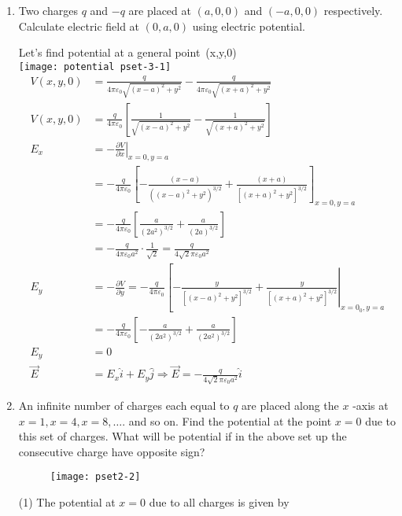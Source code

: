 \begin{enumerate}[label=\color{ocre}\textbf{\arabic*.}]
	\item  Two charges $q$ and $-q$ are placed at $(a, 0,0)$ and $(-a, 0,0)$ respectively. Calculate electric field at $(0, a, 0)$ using electric potential.
	\begin{answer}
		Let's  find potential at a general point\ (x,y,0)\\
		
		\centering
		\texttt{[image: potential pset-3-1]}
		\begin{align*}
		V(x, y, 0) &=\frac{q}{4 \pi \varepsilon_{0} \sqrt{(x-a)^{2}+y^{2}}}-\frac{q}{4 \pi \varepsilon_{0} \sqrt{(x+a)^{2}+y^{2}}} \\
		V(x, y, 0) &=\frac{q}{4 \pi \varepsilon_{0}}\left[\frac{1}{\sqrt{(x-a)^{2}+y^{2}}}-\frac{1}{\sqrt{(x+a)^{2}+y^{2}}}\right] \\
		E_{x} &=-\left.\frac{\partial V}{\partial x}\right|_{x=0, y=a}
		\\&=-\frac{q}{4 \pi \varepsilon_{0}}\left[-\frac{(x-a)}{\left((x-a)^{2}+y^{2}\right)^{3 / 2}}+\frac{(x+a)}{\left[(x+a)^{2}+y^{2}\right]^{3 / 2}}\right]_{x=0, y=a}\\
		&=-\frac{q}{4 \pi \varepsilon_{0}}\left[\frac{a}{\left(2 a^{2}\right)^{3 / 2}}+\frac{a}{(2 a)^{3 / 2}}\right] \\
		&=-\frac{q}{4 \pi \varepsilon_{0} a^{2}} \cdot \frac{1}{\sqrt{2}}=\frac{q}{4 \sqrt{2} \pi \varepsilon_{0} a^{2}}\\
		E_{y} &=-\frac{\partial V}{\partial y}=-\frac{q}{4 \pi \varepsilon_{0}}\left[-\frac{y}{\left[(x-a)^{2}+y^{2}\right]^{3 / 2}}+\left.\frac{y}{\left[(x+a)^{2}+y^{2}\right]^{3 / 2}}\right|_{x=0_{0}, y=a}\right.\\
		&=-\frac{q}{4 \pi \varepsilon_{0}}\left[-\frac{a}{\left(2 a^{2}\right)^{3 / 2}}+\frac{a}{\left(2 a^{2}\right)^{3 / 2}}\right]\\
		E_{y}&=0 \\
		\vec{E}&=E_{x} \hat{i}+E_{y} \hat{j} \Rightarrow \vec{E}=-\frac{q}{4 \sqrt{2 }\pi \varepsilon_{0} a^{2}} \hat{i}
		\end{align*}
	\end{answer}
	\item An infinite number of charges each equal to $q$ are placed along the $x$ -axis at $x=1, x=4, x=8, \ldots .$ and so on.
	Find the potential at the point $x=0$ due to this set of charges.{ What will be potential if in the above set up the consecutive charge have opposite sign? }
	\begin{figure}[H]
		\begin{center}
			\texttt{[image: pset2-2]}
		\end{center}
	\end{figure}
	\begin{answer}
		(1) The potential at $x=0$ due to all charges is given by
		

\end{answer}
\end{enumerate}
